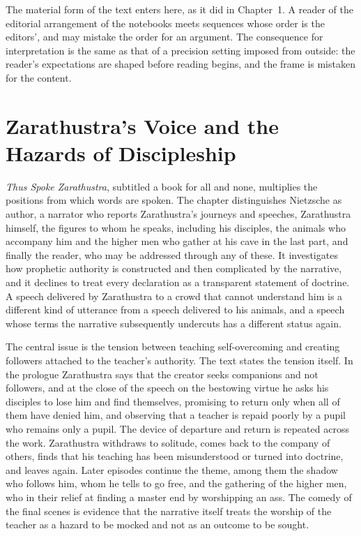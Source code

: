The material form of the text enters here, as it did in Chapter~1. A reader of the editorial arrangement of the notebooks meets sequences whose order is the editors', and may mistake the order for an argument. The consequence for interpretation is the same as that of a precision setting imposed from outside: the reader's expectations are shaped before reading begins, and the frame is mistaken for the content.

\chapter{Zarathustra's Voice and the Hazards of Discipleship}

\emph{Thus Spoke Zarathustra}, subtitled a book for all and none, multiplies the positions from which words are spoken. The chapter distinguishes Nietzsche as author, a narrator who reports Zarathustra's journeys and speeches, Zarathustra himself, the figures to whom he speaks, including his disciples, the animals who accompany him and the higher men who gather at his cave in the last part, and finally the reader, who may be addressed through any of these. It investigates how prophetic authority is constructed and then complicated by the narrative, and it declines to treat every declaration as a transparent statement of doctrine. A speech delivered by Zarathustra to a crowd that cannot understand him is a different kind of utterance from a speech delivered to his animals, and a speech whose terms the narrative subsequently undercuts has a different status again.

The central issue is the tension between teaching self-overcoming and creating followers attached to the teacher's authority. The text states the tension itself. In the prologue Zarathustra says that the creator seeks companions and not followers, and at the close of the speech on the bestowing virtue he asks his disciples to lose him and find themselves, promising to return only when all of them have denied him, and observing that a teacher is repaid poorly by a pupil who remains only a pupil. The device of departure and return is repeated across the work. Zarathustra withdraws to solitude, comes back to the company of others, finds that his teaching has been misunderstood or turned into doctrine, and leaves again. Later episodes continue the theme, among them the shadow who follows him, whom he tells to go free, and the gathering of the higher men, who in their relief at finding a master end by worshipping an ass. The comedy of the final scenes is evidence that the narrative itself treats the worship of the teacher as a hazard to be mocked and not as an outcome to be sought.

